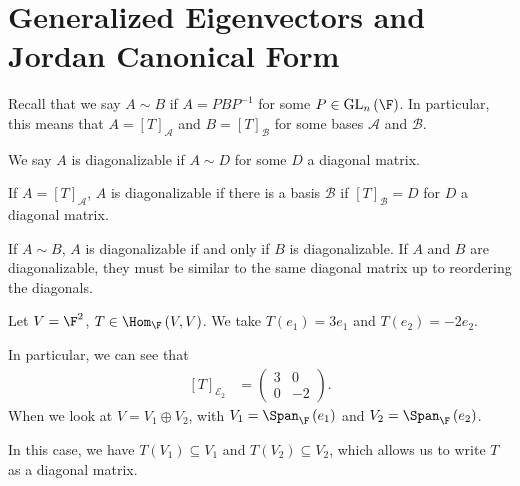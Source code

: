\documentclass[10pt]{mypackage}
\begin{document}
\section{Generalized Eigenvectors and Jordan Canonical Form}%
Recall that we say $A \sim B$ if $A = PBP^{-1}$ for some $P\in \text{GL}_{n}\left(\F\right)$. In particular, this means that $A = \left[T\right]_{\mathcal{A}}$ and $B = \left[T\right]_{\mathcal{B}}$ for some bases $\mathcal{A}$ and $\mathcal{B}$.
\begin{definition}[Diagonalizable]
  We say $A$ is diagonalizable if $A \sim D$ for some $D$ a diagonal matrix.\newline

  If $A = \left[T\right]_{\mathcal{A}}$, $A$ is diagonalizable if there is a basis $\mathcal{B}$ if $\left[T\right]_{\mathcal{B}} = D$ for $D$ a diagonal matrix.\newline

  If $A\sim B$, $A$ is diagonalizable if and only if $B$ is diagonalizable. If $A$ and $B$ are diagonalizable, they must be similar to the same diagonal matrix up to reordering the diagonals.
\end{definition}
\begin{example}
  Let $V = \F^2$, $T \in \Hom_{\F}\left(V,V\right)$. We take $T\left(e_1\right) = 3e_1$ and $T\left(e_2\right) = -2e_2$.\newline

  In particular, we can see that
  \begin{align*}
    \left[T\right]_{\mathcal{E}_2} &= \begin{pmatrix}3 & 0 \\ 0 & -2\end{pmatrix}.
  \end{align*}
  When we look at $V = V_1\oplus V_2$, with $V_1 = \Span_{\F}\left(e_1\right)$ and $V_2 = \Span_{\F}\left(e_2\right)$.\newline

  In this case, we have $T\left(V_1\right)\subseteq V_1$ and $T\left(V_2\right) \subseteq V_2$, which allows us to write $T$ as a diagonal matrix.
\end{example}
\end{document}
